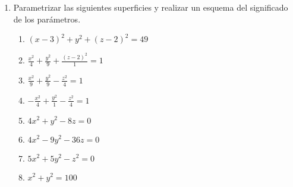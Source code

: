 \documentclass[a4paper]{article}
\newcommand{\exercise}{\item}
\newcommand{\df}[2]{\displaystyle\frac{#1}{#2}}
\begin{document}
\begin{enumerate}
\begin{multicols}{2}
\begin{enumerate} [label=(\alph*)]
		\item Un hiperboloide de una hoja
		\item Una hiperboloide de una hoja con sección circular
		\item Una hiperboloide de dos hojas
		\item Una superficie cilíndrica recta de directriz hiperbólica
		\item Una elipsoide cuya intersección con el plano $xz$ es una elipse de eje focal $z$, con semidiametro menor $3$ y semidiametro mayor $4$
		\item Una superficie cilindrica cuya intersección con el plano $yz$ es una hipérbola con diámetros transverso y conjugado iguales 
	\end{enumerate}
	\end{multicols}
	\exercise Parametrizar las siguientes superficies y realizar un esquema del significado de los parámetros.
	\begin{multicols}{2}
	\begin{enumerate} [label=(\alph*)]
		\item $(x-3)^2+y^2+(z-2)^2=49$
		\item $\df{x^2}{4}+\df{y^2}{9}+\df{(z-2)^2}{1}=1$
		\item $\df{x^2}{9}+\df{y^2}{9}-\df{z^2}{4}=1$
		\item $-\df{x^2}{4}+\df{y^2}{1}-\df{z^2}{4}=1$
		\item $4x^2+y^2-8z=0$
		\item $4x^2-9y^2-36z=0$
		\item $5x^2+5y^2-z^2=0$
		\item $x^2+y^2=100$
	\end{enumerate}
	\end{multicols}
\end{enumerate}
\vspace{20pt} 
\end{document}
